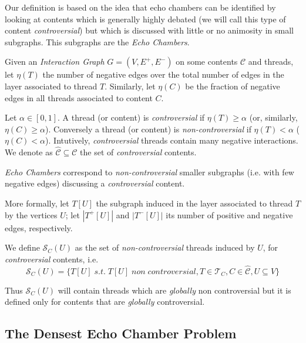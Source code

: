 Our definition is based on the idea that echo chambers can be identified by
looking at contents which is generally highly debated (we will call
this type of content \emph{controversial}) but which is discussed with little
or no animosity in small subgraphs. This subgraphs are the \emph{Echo
	Chambers}.

\bigskip

Given an \emph{Interaction Graph} $G = (V, E^{+}, E^{-})$ on some contents
$\mathcal{C} $ and threads, let $\eta(T)$ the number of negative edges over the
total number of edges in the layer associated to thread $T$. Similarly,
let $\eta(C)$ be the fraction of negative edges in all threads associated to
content $C$.

Let $\alpha \in [0,1]$. A thread (or content) is \emph{controversial} if
$\eta(T) \geq \alpha$ (or, similarly, $\eta(C) \geq \alpha $). Conversely a
thread (or content) is \emph{non-controversial} if $\eta(T) < \alpha$ ($\eta(C) <
	\alpha$). Intutively, \emph{controversial} threads contain many negative
interactions. We denote as $\hat{\mathcal{C} } \subseteq \mathcal{C} $ the
set of \emph{controversial} contents.

\medskip

\emph{Echo Chambers} correspond to \emph{non-controversial} smaller subgraphs
(i.e. with few negative edges) discussing a
\emph{controversial} content.

More formally, let $T[U]$ the subgraph induced in the layer associated to
thread $T$ by the vertices $U$; let $|T^{+} [U]|$ and $|T^{-} [U]|$ its number
of positive and negative edges, respectively.

We define $\mathcal{S}_C (U)$ as the set of \emph{non-controversial} threads
induced by $U$, for \textit{controversial} contents, i.e.
	{\small
		\begin{equation}
			\mathcal{S} _{C} (U) = \{ T[U] \; s.t. \; T[U] \; non \;
			controversial, T \in \mathcal{T} _{C}, C
			\in \hat{\mathcal{C}}, U \subseteq V\}
		\end{equation}
	}

Thus $\mathcal{S} _C (U)$ will contain threads which are \emph{globally} non
controversial but it is defined only for contents that are \emph{globally}
controversial.

\medskip

\subsection{The Densest Echo Chamber Problem}%
\label{sub:the_densest_echo_chamber_problem}

